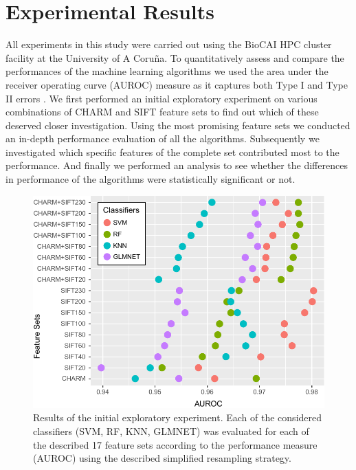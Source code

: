 \section{Experimental Results}
\label{sec:experimental-results}

All experiments in this study were carried out using the BioCAI HPC cluster facility at the University of A Coru\~{n}a. To quantitatively assess and compare the performances of the machine learning algorithms we used the area under the receiver operating curve (AUROC) measure as it captures both Type I and Type II errors \cite{Fawcett:2006:IRA:1159473.1159475}. We first performed an initial exploratory experiment on various combinations of CHARM and SIFT feature sets to find out which of these deserved closer investigation. Using the most promising feature sets we conducted an in-depth performance evaluation of all the algorithms. Subsequently we investigated which specific features of the complete set contributed most to the performance. And finally we performed an analysis to see whether the differences in performance of the algorithms were statistically significant or not.

\begin{figure}
	\centering
	\includegraphics[width=\columnwidth]{fig04}
	\caption{Results of the initial exploratory experiment. Each of the considered classifiers (SVM, RF, KNN, GLMNET) was evaluated for each of the {\color{red}described} 17 feature sets according to the performance measure (AUROC) using the described simplified resampling strategy.}
	\label{fig:initialResults}
\end{figure}

